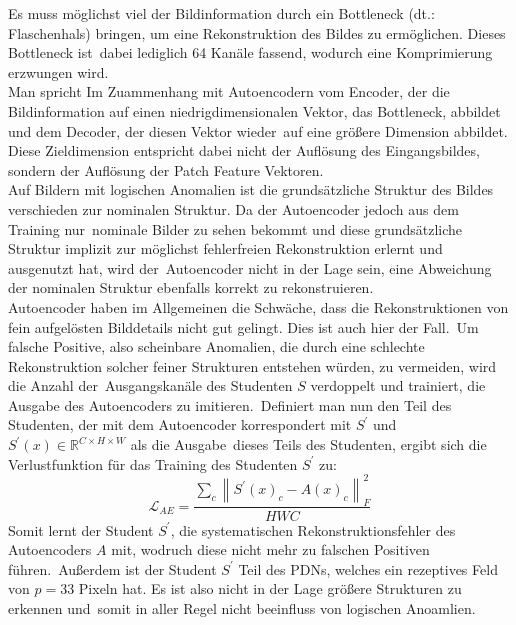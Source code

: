 Es muss möglichst viel der Bildinformation durch ein \glqq Bottleneck\grqq{} (dt.: Flaschenhals) bringen, um eine Rekonstruktion des Bildes zu ermöglichen. Dieses Bottleneck ist\
dabei lediglich 64 Kanäle fassend, wodurch eine Komprimierung erzwungen wird.\\
Man spricht Im Zuammenhang mit Autoencodern vom Encoder, der die Bildinformation auf einen niedrigdimensionalen Vektor, das Bottleneck, abbildet und dem Decoder, der diesen Vektor wieder\
auf eine größere Dimension abbildet. Diese Zieldimension entspricht dabei nicht der Auflösung des Eingangsbildes, sondern der Auflösung der Patch Feature Vektoren.\\
Auf Bildern mit logischen Anomalien ist die grundsätzliche Struktur des Bildes verschieden zur nominalen Struktur. Da der Autoencoder jedoch aus dem Training nur\
nominale Bilder zu sehen bekommt und diese grundsätzliche Struktur implizit zur möglichst fehlerfreien Rekonstruktion erlernt und ausgenutzt hat, wird der\
Autoencoder nicht in der Lage sein, eine Abweichung der nominalen Struktur ebenfalls korrekt zu rekonstruieren.\\
Autoencoder haben im Allgemeinen die Schwäche, dass die Rekonstruktionen von fein aufgelösten Bilddetails nicht gut gelingt. Dies ist auch hier der Fall.\
Um falsche Positive, also scheinbare Anomalien, die durch eine schlechte Rekonstruktion solcher feiner Strukturen entstehen würden, zu vermeiden, wird die Anzahl der\
Ausgangskanäle des Studenten $S$ verdoppelt und trainiert, die Ausgabe des Autoencoders zu imitieren.\
Definiert man nun den Teil des Studenten, der mit dem Autoencoder korrespondert mit $S^{\prime}$ und $S^{\prime}(x) \in \mathbb{R}^{C \times H \times W}$ als die Ausgabe\
dieses Teils des Studenten, ergibt sich die Verlustfunktion für das Training des Studenten $S^{\prime}$ zu:\
$$
\mathcal{L}_{AE} = \frac{\sum_{c}\left\lVert S^{\prime}(x)_{c}-A(x)_{c} \right\rVert_{F}^{2}}{HWC}
$$
Somit lernt der Student $S^{\prime}$, die systematischen Rekonstruktionsfehler des Autoencoders $A$ mit, wodruch diese nicht mehr zu falschen Positiven führen.\
Außerdem ist der Student $S^{\prime}$ Teil des PDNs, welches ein rezeptives Feld von $p=33$ Pixeln hat. Es ist also nicht in der Lage größere Strukturen zu erkennen und\
somit in aller Regel nicht beeinfluss von logischen Anoamlien.\\
